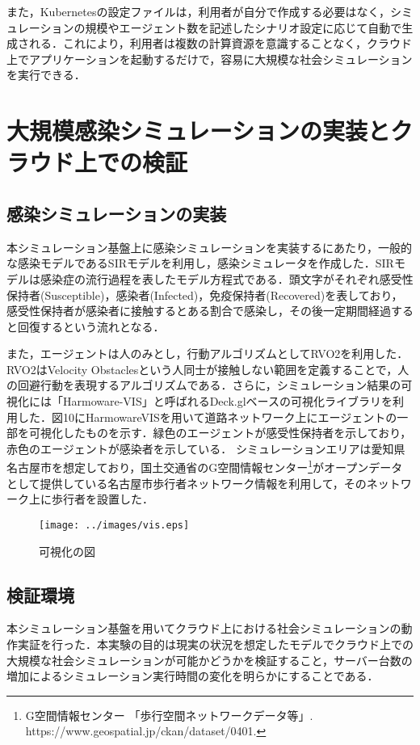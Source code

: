 \documentclass[originalpaper]{jsaiart}     %
\begin{document}
また，Kubernetesの設定ファイルは，利用者が自分で作成する必要はなく，シミュレーションの規模やエージェント数を記述したシナリオ設定に応じて自動で生成される．これにより，利用者は複数の計算資源を意識することなく，クラウド上でアプリケーションを起動するだけで，容易に大規模な社会シミュレーションを実行できる．



\section{大規模感染シミュレーションの実装とクラウド上での検証} %
\subsection{感染シミュレーションの実装}
本シミュレーション基盤上に感染シミュレーションを実装するにあたり，一般的な感染モデルであるSIRモデル\cite{Kermack}を利用し，感染シミュレータを作成した．SIRモデルは感染症の流行過程を表したモデル方程式である．頭文字がそれぞれ感受性保持者(Susceptible)，感染者(Infected)，免疫保持者(Recovered)を表しており，感受性保持者が感染者に接触するとある割合で感染し，その後一定期間経過すると回復するという流れとなる．

また，エージェントは人のみとし，行動アルゴリズムとしてRVO2\cite{Berg}を利用した．RVO2はVelocity Obstaclesという人同士が接触しない範囲を定義することで，人の回避行動を表現するアルゴリズムである．さらに，シミュレーション結果の可視化には「Harmoware-VIS」と呼ばれるDeck.glベースの可視化ライブラリ\cite{Hiroi}を利用した．図10にHarmowareVISを用いて道路ネットワーク上にエージェントの一部を可視化したものを示す．緑色のエージェントが感受性保持者を示しており，赤色のエージェントが感染者を示している．
シミュレーションエリアは愛知県名古屋市を想定しており，国土交通省のG空間情報センター\footnote{G空間情報センター 「歩行空間ネットワークデータ等」. https://www.geospatial.jp/ckan/dataset/0401.}がオープンデータとして提供している名古屋市歩行者ネットワーク情報を利用して，そのネットワーク上に歩行者を設置した．

\begin{figure}[t]
    \begin{center}
        \texttt{[image: ../images/vis.eps]}
    \end{center}
    \caption{可視化の図}
    \label{dummy}
\end{figure}


\subsection{検証環境}
本シミュレーション基盤を用いてクラウド上における社会シミュレーションの動作実証を行った．本実験の目的は現実の状況を想定したモデルでクラウド上での大規模な社会シミュレーションが可能かどうかを検証すること，サーバー台数の増加によるシミュレーション実行時間の変化を明らかにすることである．
\end{document}
